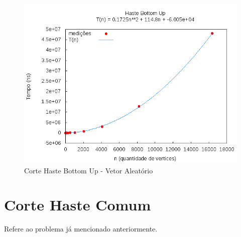 \documentclass[12pt,a4paper,twoside]{report}
\begin{document}
\begin{figure}[H]
    \centering
    \includegraphics[width=0.7\linewidth]{graficos/CorteHasteBottomUp/HasteBU.png}
  \caption{Corte Haste Bottom Up - Vetor Aleatório}
\end{figure}

\section{Corte Haste Comum}

Refere ao problema já mencionado anteriormente.
\end{document}
